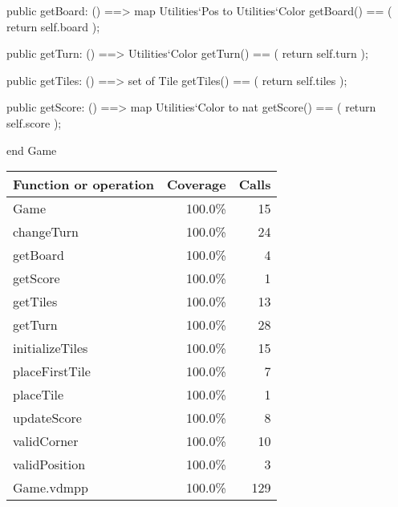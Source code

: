 \begin{vdm_al}
        public getBoard: () ==> map Utilities`Pos to Utilities`Color
          getBoard() == (
            return self.board
          );
          
      public getTurn: () ==> Utilities`Color
          getTurn() == (
            return self.turn
          );
          
      public getTiles: () ==> set of Tile
        getTiles() == (
          return self.tiles
        );
        
    public getScore: () ==> map Utilities`Color to nat
        getScore() == (
          return self.score
        );

end Game
\end{vdm_al}
\bigskip
\begin{longtable}{|l|r|r|}
\hline
Function or operation & Coverage & Calls \\
\hline
\hline
Game & 100.0\% & 15 \\
\hline
changeTurn & 100.0\% & 24 \\
\hline
getBoard & 100.0\% & 4 \\
\hline
getScore & 100.0\% & 1 \\
\hline
getTiles & 100.0\% & 13 \\
\hline
getTurn & 100.0\% & 28 \\
\hline
initializeTiles & 100.0\% & 15 \\
\hline
placeFirstTile & 100.0\% & 7 \\
\hline
placeTile & 100.0\% & 1 \\
\hline
updateScore & 100.0\% & 8 \\
\hline
validCorner & 100.0\% & 10 \\
\hline
validPosition & 100.0\% & 3 \\
\hline
\hline
Game.vdmpp & 100.0\% & 129 \\
\hline
\end{longtable}

